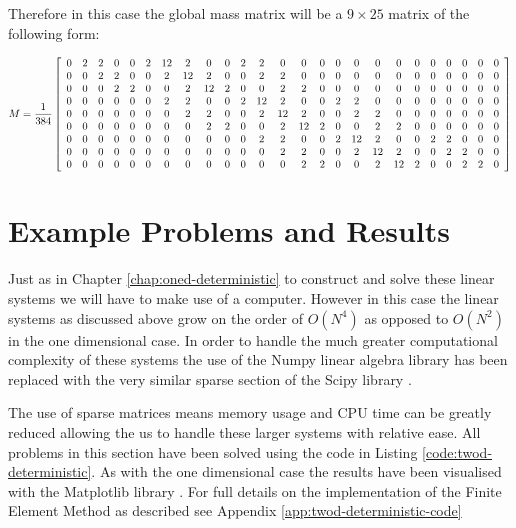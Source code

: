 Therefore in this case the global mass matrix will be a $9 \times 25$ matrix of
the following form:

\begin{equation}
    M = \frac{1}{384}
        \left[\begin{array}{c c c c c c c c c c c c c c c c c c c c c c c c c}
    0 & 2 & 2 & 0 & 0 & 2 & 12 & 2 & 0 & 0 & 2 & 2 & 0 & 0 & 0 & 0 & 0 & 0 & 0 & 0 & 0 & 0 & 0 & 0 & 0 \\
    0 & 0 & 2 & 2 & 0 & 0 & 2 & 12 & 2 & 0 & 0 & 2 & 2 & 0 & 0 & 0 & 0 & 0 & 0 & 0 & 0 & 0 & 0 & 0 & 0 \\
    0 & 0 & 0 & 2 & 2 & 0 & 0 & 2 & 12 & 2 & 0 & 0 & 2 & 2 & 0 & 0 & 0 & 0 & 0 & 0 & 0 & 0 & 0 & 0 & 0 \\
    0 & 0 & 0 & 0 & 0 & 0 & 2 & 2 & 0 & 0 & 2 & 12 & 2 & 0 & 0 & 2 & 2 & 0 & 0 & 0 & 0 & 0 & 0 & 0 & 0 \\
    0 & 0 & 0 & 0 & 0 & 0 & 0 & 2 & 2 & 0 & 0 & 2 & 12 & 2 & 0 & 0 & 2 & 2 & 0 & 0 & 0 & 0 & 0 & 0 & 0 \\
    0 & 0 & 0 & 0 & 0 & 0 & 0 & 0 & 2 & 2 & 0 & 0 & 2 & 12 & 2 & 0 & 0 & 2 & 2 & 0 & 0 & 0 & 0 & 0 & 0 \\
    0 & 0 & 0 & 0 & 0 & 0 & 0 & 0 & 0 & 0 & 0 & 2 & 2 & 0 & 0 & 2 & 12 & 2 & 0 & 0 & 2 & 2 & 0 & 0 & 0 \\
    0 & 0 & 0 & 0 & 0 & 0 & 0 & 0 & 0 & 0 & 0 & 0 & 2 & 2 & 0 & 0 & 2 & 12 & 2 & 0 & 0 & 2 & 2 & 0 & 0 \\
    0 & 0 & 0 & 0 & 0 & 0 & 0 & 0 & 0 & 0 & 0 & 0 & 0 & 2 & 2 & 0 & 0 & 2 & 12 & 2 & 0 & 0 & 2 & 2 & 0
    \end{array}\right]
\end{equation}

\section{Example Problems and Results}

Just as in Chapter \ref{chap:oned-deterministic} to construct and solve these
linear systems we will have to make use of a computer. However in this case the
linear systems as discussed above  grow
on the order of $O(N^4)$ as opposed to $O(N^2)$ in the one dimensional case. In
order to handle the much greater computational complexity of these systems the
use of the Numpy linear algebra library has been replaced with the very similar
sparse section of the Scipy library \cite{scipy}.

The use of sparse matrices means memory usage and CPU time can be greatly
reduced allowing the us to handle these larger systems with relative ease. All
problems in this section have been solved using the code in Listing
\ref{code:twod-deterministic}. As with the one dimensional case the results
have been visualised with the Matplotlib library \cite{matplotlib}. For full
details on the implementation of the Finite Element Method as described see
Appendix \ref{app:twod-deterministic-code}

